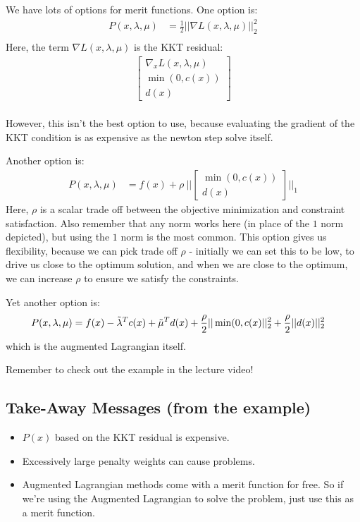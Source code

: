 \noindent
We have lots of options for merit functions. One option is: 
\begin{align}
    P(x, \lambda, \mu) &= \frac{1}{2} || \nabla L(x, \lambda, \mu) ||_2^2 \\
\end{align}
Here, the term $\nabla L(x, \lambda, \mu)$ is the KKT residual: 
\begin{align}
    \begin{bmatrix}
        \nabla_x L(x,\lambda,\mu) \\
        \min(0, c(x)) \\
        d(x)
    \end{bmatrix}
\end{align}\\
However, this isn't the best option to use, because evaluating the gradient of the KKT condition is as expensive as the newton step solve itself.

\noindent
Another option is:
\begin{align}
    P(x,\lambda, \mu) &= f(x) + \rho \ || \begin{bmatrix}
        \min (0,c(x)) \\ 
        d(x) 
    \end{bmatrix} ||_1
\end{align}
Here, $\rho$ is a scalar trade off between the objective minimization and constraint satisfaction. Also remember that any norm works here (in place of the $1$ norm depicted), but using the $1$  norm is the most common. 
This option gives us flexibility, because we can pick trade off $\rho$ - initially we can set this to be low, to drive us close to the optimum solution, and when we are close to the optimum, we can increase $\rho$ to ensure we satisfy the constraints. 

Yet another option is: 
\begin{align}
    P(x, \lambda, \mu) &= f(x) - \Tilde{\lambda}^T c(x) + \Tilde{\mu}^T d(x) + \frac{\rho}{2} || \min(0,c(x) ||_2^2 + \frac{\rho}{2} || d(x) ||_2^2 
\end{align}
which is the augmented Lagrangian itself.

\noindent
Remember to check out the example in the lecture video! 

\subsection{Take-Away Messages (from the example)}
\begin{itemize}
    \item $P(x)$ based on the KKT residual is expensive. 
    \item Excessively large penalty weights can cause problems. 
    \item Augmented Lagrangian methods come with a merit function for free. So if we're using the Augmented Lagrangian to solve the problem, just use this as a merit function.
\end{itemize}

